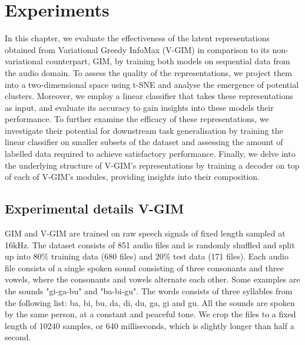 \chapter{Experiments}

In this chapter, we evaluate the effectiveness of the latent representations obtained from Variational Greedy InfoMax (V-GIM) in comparison to its non-variational counterpart, GIM, by training both models on sequential data from the audio domain. To assess the quality of the representations, we project them into a two-dimensional space using t-SNE and analyse the emergence of potential clusters. Moreover, we employ a linear classifier that takes these representations as input, and evaluate its accuracy to gain insights into these models their performance. To further examine the efficacy of these representations, we investigate their potential for downstream task generalisation by training the linear classifier on smaller subsets of the dataset and assessing the amount of labelled data required to achieve satisfactory performance. Finally, we delve into the underlying structure of V-GIM's representations by training a decoder on top of each of V-GIM's modules, providing insights into their composition.


%	

	







\section{Experimental details V-GIM} \label{cha:experim_details_vgim}
		GIM and V-GIM are trained on raw speech signals of fixed length sampled at 16kHz. The dataset consists of 851  audio files and is randomly shuffled and split up into 80\% training data (680 files) and 20\% test data (171 files). Each audio file consists of a single spoken sound consisting of three consonants and three vowels, where the consonants and vowels alternate each other. Some examples are the sounds "gi-ga-bu" and "ba-bi-gu".	The words consists of three syllables from the following list: ba, bi, bu, da, di, du, ga, gi and gu. All the sounds are spoken by the same person, at a constant and peaceful tone. We crop the files to a fixed length of 10240 samples, or 640 milliseconds, which is slightly longer than half a second.
		
